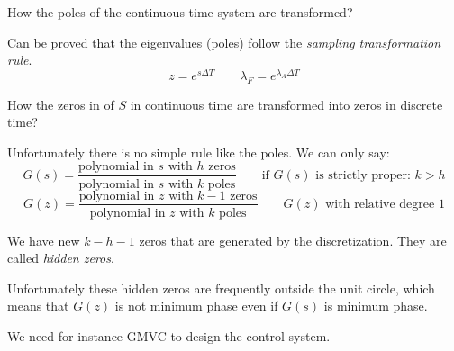 \begin{rem}
    How the poles of the continuous time system are transformed?

    Can be proved that the eigenvalues (poles) follow the \emph{sampling transformation rule}.
    \[
        z = e^{s\Delta T} \qquad \lambda_F = e^{\lambda_A \Delta T}
    \]

    \begin{figure}[H]
        \centering
    \end{figure}

    How the zeros in of $S$ in continuous time are transformed into zeros in discrete time?

    Unfortunately there is no simple rule like the poles. We can only say:
    \[
        G(s) = \frac{\text{polynomial in $s$ with $h$ zeros}}{\text{polynomial in $s$ with $k$ poles}} \qquad \text{if $G(s)$ is strictly proper: } k > h
    \]
    \[
        G(z) = \frac{\text{polynomial in $z$ with $k-1$ zeros}}{\text{polynomial in $z$ with $k$ poles}} \qquad \text{$G(z)$ with relative degree 1}
    \]

    We have new $k-h-1$ zeros that are generated by the discretization.
    They are called \emph{hidden zeros}.

    Unfortunately these hidden zeros are frequently outside the unit circle, which means that $G(z)$ is not minimum phase even if $G(s)$ is minimum phase.

    We need for instance GMVC to design the control system.
\end{rem}

